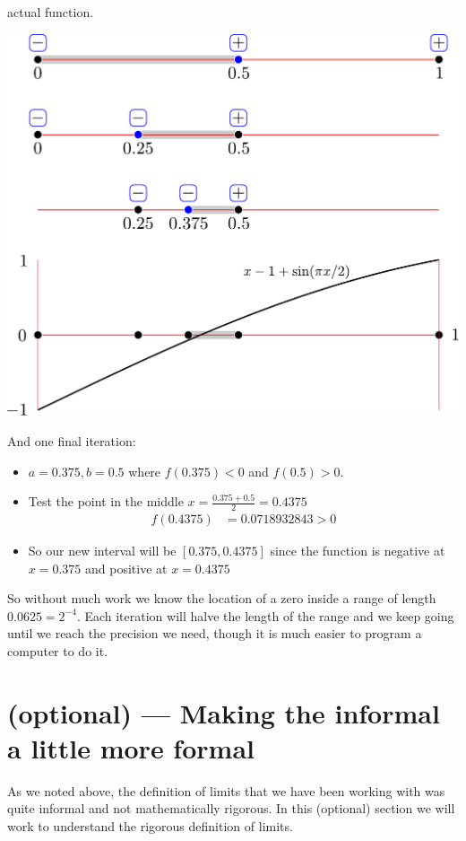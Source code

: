 \begin{eg}
actual function.
\begin{efig}
 \begin{center}
  \includegraphics[width=\textwidth]{ivt_eg}
 \end{center}
\end{efig}

And one final iteration:
\begin{itemize}
 \item $a=0.375, b=0.5$ where $f(0.375)<0$ and $f(0.5)>0$.
 \item Test the point in the middle $x = \frac{0.375+0.5}{2} = 0.4375$
\begin{align*}
  f(0.4375) &= 0.0718932843>0
\end{align*}
\item So our new interval will be $[0.375,0.4375]$ since the function is
negative at $x=0.375$ and positive at $x=0.4375$
\end{itemize}
So without much work we know the location of a zero inside a range of length
$0.0625 = 2^{-4}$. Each iteration will halve the length of the range and we
keep going until we reach the precision we need, though it is much easier to
program a computer to do it.
\end{eg}

\section{(optional) --- Making the informal a little more formal}
\label{sec opt formal limit}
As we noted above, the definition of limits that we have been working with was
quite informal and not mathematically rigorous. In this (optional) section we
will work to understand the rigorous definition of limits.

